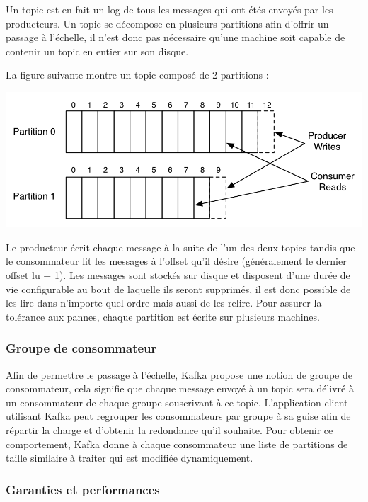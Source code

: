 \documentclass[a4paper, 11pt, titlepage]{article}
\begin{document}
Un topic est en fait un log de tous les messages qui ont étés envoyés par les producteurs. Un topic se décompose en plusieurs partitions afin d'offrir un passage à l'échelle, il n'est donc pas nécessaire qu'une machine soit capable de contenir un topic en entier sur son disque.


La figure suivante montre un topic composé de 2 partitions :

\begin{center}
\includegraphics[scale=0.8]{res/topic_kafka.png}
\end{center}

Le producteur écrit chaque message à la suite de l'un des deux topics tandis que le consommateur lit les messages à l'offset qu'il désire (généralement le dernier offset lu + 1).
Les messages sont stockés sur disque et disposent d'une durée de vie configurable au bout de laquelle ils seront supprimés, il est donc possible de les lire dans n'importe quel ordre mais aussi de les relire.
Pour assurer la tolérance aux pannes, chaque partition est écrite sur plusieurs machines.


\subsubsection* {Groupe de consommateur}

Afin de permettre le passage à l'échelle, Kafka propose une notion de groupe de consommateur, cela signifie que chaque message envoyé à un topic sera délivré à un consommateur de chaque groupe souscrivant à ce topic. L'application client utilisant Kafka peut regrouper les consommateurs par groupe à sa guise afin de répartir la charge et d'obtenir la redondance qu'il souhaite. Pour obtenir ce comportement, Kafka donne à chaque consommateur une liste de partitions de taille similaire à traiter qui est modifiée dynamiquement.



\subsubsection* {Garanties et performances}
\end{document}
